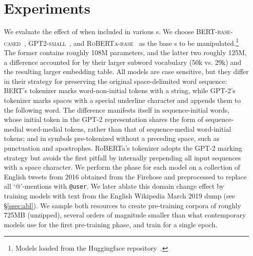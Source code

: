 \section{Experiments}
\label{sec:exp}


We evaluate the effect of \tokdetok{} when included in various \llm{}s. 
We choose \textsc{BERT-base-cased}~\cite{devlin-etal-2019-bert}, \textsc{GPT2-small}~\cite{radford2019language}, and \textsc{RoBERTa-base}~\cite{liu2019roberta} as the base \llm{}s to be manipulated.\footnote{Models loaded from the Huggingface repository~\cite{wolf-etal-2020-transformers}.}
The former contains roughly 108M parameters, and the latter two roughly 125M, a difference accounted for by their larger subword vocabulary (50k vs. 29k) and the resulting larger embedding table.
All models are case sensitive, but they differ in their strategy for preserving the original space-delimited word sequence: BERT's tokenizer marks word-non-initial tokens with a \say{\#\#} string, while GPT-2's tokenizer marks spaces with a special underline character and appends them to the following word.
The difference manifests itself in sequence-initial words, whose initial token in the GPT-2 representation shares the form of sequence-medial word-medial tokens, rather than that of sequence-medial word-initial tokens; and in symbols pre-tokenized without a preceding space, such as punctuation and apostrophes.
RoBERTa's tokenizer adopts the GPT-2 marking strategy but avoids the first pitfall by internally prepending all input sequences with a space character.
We perform the \ppt{} phase for each model on a collection of English tweets from 2016 obtained from the Firehose and preprocessed to replace all `@'-mentions with \texttt{@user}.
We later ablate this domain change effect by training models with \ppt{} text from the English Wikipedia March 2019 dump (see \S\ref{ssec:abl}).
We sample both resources to create pre-training corpora of roughly 725MB (unzipped), several orders of magnitude smaller than what contemporary models use for the first pre-training phase, and train for a single epoch.

